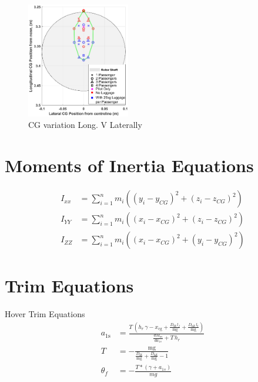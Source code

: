 \documentclass[11pt,a4paper]{article}
\begin{document}
\begin{appendices}
\begin{figure}[H]
    \centering
    \includegraphics[width=0.4\textwidth]{CGLATVLONG.eps}
    \caption{CG variation Long. V Laterally}
    \label{fig:cglongvlat}
\end{figure}{}
%
%
\section{Moments of Inertia Equations}
\renewcommand\thefigure{B.\arabic{figure}}  
\setcounter{figure}{0}
\renewcommand\theequation{B.\arabic{equation}}  
\setcounter{equation}{0}
\renewcommand\thetable{B.\arabic{table}}  
\setcounter{table}{0}
\begin{align}
I_{xx}&=\sum_{i=1}^{n} m_{i}\left(\left(y_{i}-y_{C G}\right)^{2}+\left(z_{i}-z_{C G}\right)^{2}\right)\label{eq:ixx}\\
   I_{YY}&=\sum_{i=1}^{n} m_{i}\left(\left(x_{i}-x_{C G}\right)^{2}+\left(z_{i}-z_{C G}\right)^{2}\right)\\
   I_{ZZ}&=\sum_{i=1}^{n} m_{i}\left(\left(x_{i}-x_{C G}\right)^{2}+\left(y_{i}-y_{C G}\right)^{2}\right) \label{eq:izz}
\end{align}{}

\thispagestyle{empty}
%
%
\section{Trim Equations}
\renewcommand\thefigure{C.\arabic{figure}}  
\setcounter{figure}{0}
\renewcommand\theequation{C.\arabic{equation}}  
\setcounter{equation}{0}
\renewcommand\thetable{C.\arabic{table}}  
\setcounter{table}{0}
\thispagestyle{empty}
Hover Trim Equations
\begin{align}
    a_{\mathrm{1s}}&=\frac{T\,\left(h_{r}\,\gamma-x_{\mathrm{cg}}+\frac{D_{\mathrm{fZ}}\,l_{f}}{\mathrm{mg}}+\frac{D_{\mathrm{hZ}}\,l_{t}}{\mathrm{mg}}\right)}{\frac{dM_m}{da_{1s}}+T\,h_{r}}\\
    T&=-\frac{\mathrm{mg}}{\frac{D_{\mathrm{fZ}}}{\mathrm{mg}}+\frac{D_{\mathrm{hZ}}}{\mathrm{mg}}-1}\\
    \theta_f&=-\frac{T*(\gamma + a_{1s})}{mg} \label{eq:trimeq}
\end{align}{}


\end{appendices}
\end{document}
